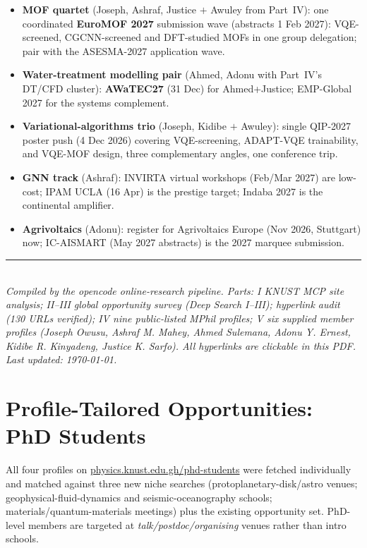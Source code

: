 \documentclass[11pt,a4paper]{article}
\begin{document}
\begin{itemize}[leftmargin=1.4em]
  \item \textbf{MOF quartet} (Joseph, Ashraf, Justice $+$ Awuley from Part~IV): one coordinated \textbf{EuroMOF 2027} submission wave (abstracts 1 Feb 2027): VQE-screened, CGCNN-screened and DFT-studied MOFs in one group delegation; pair with the ASESMA-2027 application wave.
  \item \textbf{Water-treatment modelling pair} (Ahmed, Adonu with Part~IV's DT/CFD cluster): \textbf{AWaTEC27} (31 Dec) for Ahmed+Justice; EMP-Global 2027 for the systems complement.
  \item \textbf{Variational-algorithms trio} (Joseph, Kidibe $+$ Awuley): single QIP-2027 poster push (4 Dec 2026) covering VQE-screening, ADAPT-VQE trainability, and VQE-MOF design, three complementary angles, one conference trip.
  \item \textbf{GNN track} (Ashraf): INVIRTA virtual workshops (Feb/Mar 2027) are low-cost; IPAM UCLA (16 Apr) is the prestige target; Indaba 2027 is the continental amplifier.
  \item \textbf{Agrivoltaics} (Adonu): register for Agrivoltaics Europe (Nov 2026, Stuttgart) now; IC-AISMART (May 2027 abstracts) is the 2027 marquee submission.
\end{itemize}

\bigskip
\noindent\rule{\textwidth}{0.4pt}\\
\small\emph{Compiled by the opencode online-research pipeline. Parts: I KNUST MCP site analysis; II--III global opportunity survey (Deep Search I--III); hyperlink audit (130 URLs verified); IV nine public-listed MPhil profiles; V six supplied member profiles (Joseph Owusu, Ashraf M. Mahey, Ahmed Sulemana, Adonu Y. Ernest, Kidibe R. Kinyadeng, Justice K. Sarfo). All hyperlinks are clickable in this PDF. Last updated: \today.}



\newpage
\part{Profile-Tailored Opportunities: PhD Students}

All four profiles on \href{https://physics.knust.edu.gh/phd-students}{physics.knust.edu.gh/phd-students} were fetched individually and matched against three new niche searches (protoplanetary-disk/astro venues; geophysical-fluid-dynamics and seismic-oceanography schools; materials/quantum-materials meetings) plus the existing opportunity set. PhD-level members are targeted at \emph{talk/postdoc/organising} venues rather than intro schools.
\end{document}
